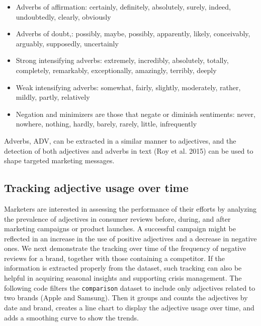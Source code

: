 \begin{itemize}
\tightlist
\item
  Adverbs of affirmation: certainly, definitely, absolutely,
  surely, indeed, undoubtedly, clearly, obviously
\item
  Adverbs of doubt,: possibly, maybe, possibly, apparently,
  likely, conceivably, arguably, supposedly, uncertainly
\item
  Strong intensifying adverbs: extremely, incredibly,
  absolutely, totally, completely, remarkably, exceptionally, amazingly,
  terribly, deeply
\item
  Weak intensifying adverbs: somewhat, fairly, slightly,
  moderately, rather, mildly, partly, relatively
\item
  Negation and minimizers are those that negate or diminish sentiments: never, nowhere, nothing, hardly, barely, rarely, little,
  infrequently
\end{itemize}

Adverbs, ADV, can be extracted in a similar manner to adjectives, and
the detection of both adjectives and adverbs in text (Roy et al. 2015)
can be used to shape targeted marketing messages.

\subsection{Tracking adjective usage over
time}\label{tracking-adjective-usage-over-time}

Marketers are interested in assessing the performance of their
efforts by analyzing the prevalence of adjectives in consumer reviews
before, during, and after marketing campaigns or product launches. A
successful campaign might be reflected in an increase in the use of positive
adjectives and a decrease in negative ones. We next demonstrate the
tracking over time of the frequency of negative reviews for a brand, together with
those containing a competitor. If the information is
extracted properly from the dataset, such tracking can also be helpful in
acquiring seasonal insights and supporting crisis management. The
following code filters the \texttt{comparison} dataset to include only
adjectives related to two brands (Apple and Samsung). Then it groups and
counts the adjectives by date and brand, creates a line chart to display
the adjective usage over time, and adds a smoothing curve to show the trends.

